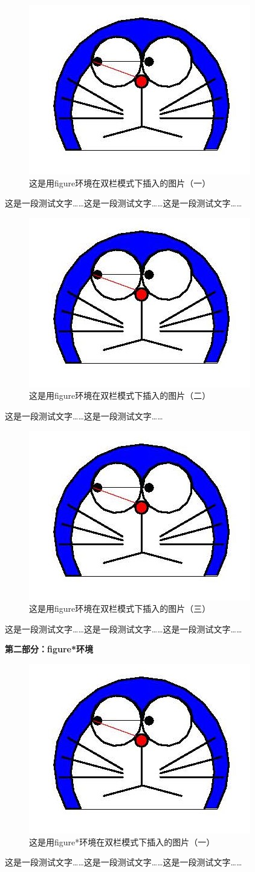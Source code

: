 \documentclass{ctexart}
\begin{document}
            \newpage 
            \begin{figure}[htbp]
                \includegraphics[width = .1\textwidth]{doraemon1.jpg}
                \caption{这是用figure环境在双栏模式下插入的图片（一）}
            \end{figure}
            这是一段测试文字……这是一段测试文字……这是一段测试文字……
            
            \begin{figure}[htbp]
                \includegraphics[width = .1\textwidth]{doraemon1.jpg}
                \caption{这是用figure环境在双栏模式下插入的图片（二）}
            \end{figure}
            这是一段测试文字……这是一段测试文字……
            \begin{figure}[htbp]
                \includegraphics[width = .1\textwidth]{doraemon1.jpg}
                \caption{这是用figure环境在双栏模式下插入的图片（三）}
            \end{figure}
            这是一段测试文字……这是一段测试文字……这是一段测试文字……


    \twocolumn
            \textbf{第二部分：figure*环境}

            \begin{figure}[htbp]
                \includegraphics[width = .1\textwidth]{doraemon1.jpg}
                \caption{这是用figure*环境在双栏模式下插入的图片（一）}
            \end{figure}
            这是一段测试文字……这是一段测试文字……这是一段测试文字……
            
\end{document}
